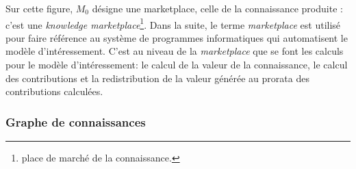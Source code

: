 Sur cette figure, $M_0$ désigne une marketplace, celle de la connaissance produite : c'est une \textit{knowledge marketplace}\footnote{place de marché de la connaissance.}. Dans la suite, le terme \textit{marketplace} est utilisé pour faire référence au système de programmes informatiques qui automatisent le modèle d'intéressement.  C'est au niveau de la \textit{marketplace} que se font les calculs pour le modèle d'intéressement: le calcul de la valeur de la connaissance, le calcul des contributions et la redistribution de la valeur générée au prorata des contributions calculées.

\subsubsection{Graphe de connaissances} \label{subsubsec:kg_graph}

